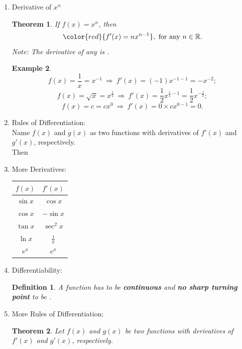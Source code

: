 \documentclass[12pt, a4paper]{article}
\newtheorem{theorem}{Theorem}[subsection]
\newtheorem{definition}{Definition}[subsection]
\newtheorem{example}{Example}[subsection]
\begin{document}
\begin{enumerate}
\begin{itemize}
\begin{example}
        At $x=3$, $f'(3)=2\times 3=6.$ The gradient is $6.$
    \end{example}
    \end{itemize}
    \item Derivative of $x^n$
    \begin{theorem}
        If $f(x)=x^n$, then 
        $${\color{red}{f'(x)=nx^{n-1}}},\ \text{for any } n \in \mathbb{R}.$$
        Note: The derivative of any {\color{red}{constant}} is {\color{red}{0}}.
    \end{theorem}
    \begin{example}
        $$f(x)=\frac{1}{x}=x^{-1}\ \Rightarrow\ f'(x)=(-1)x^{-1-1}=-x^{-2};$$
        $$f(x)=\sqrt{x}=x^{\frac{1}{2}}\ \Rightarrow\ f'(x)=\frac{1}{2}x^{\frac{1}{2}-1}=\frac{1}{2}x^{-\frac{1}{2}};$$
        $$f(x)=c=cx^0\ \Rightarrow\ f'(x)=0\times cx^{0-1}=0.$$
    \end{example}
    \item Rules of Differentiation: \\
    Name $f(x)$ and $g(x)$ as two functions with derivatives of $f'(x)$ and $g'(x)$, respectively.\\
    Then {\color{red}{$$\left(cf(x)\right)'=cf'(x)$$
    $$\left(f(x)\pm g(x)\right)'=f'(x)\pm g'(x)$$}}
    \item More Derivatives: 
    \begin{center}\begin{tabular}{c|c}
        $f(x)$&$f'(x)$\\ \hline
        $\sin x$&$\cos x$\\ 
        $\cos x$&$-\sin x$\\ 
        $\tan x$&$\sec^2x$\\
        $\ln x$&$\frac{1}{x}$\\
        $e^x$&$e^x$
    \end{tabular}\end{center}
    \item Differentiability: 
    \begin{definition}
        A function has to be \textbf{continuous} and \textbf{no sharp turning point} to be \textbf{\color{red}{differentiable}}.\\
        {\color{green}{Note: Smooth turning point on the graph is allowed.}}
    \end{definition}
    \item More Rules of Differentiation: 
    \begin{theorem}
        Let $f(x)$ and $g(x)$ be two functions with derivatives of $f'(x)$ and $g'(x)$, respectively.

\end{theorem}
\end{enumerate}
\end{document}
